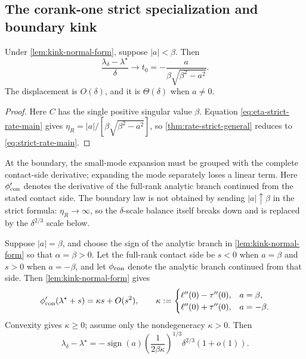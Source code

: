 \subsection{The corank-one strict specialization and boundary kink}

\begin{corollary}
\label{thm:rate-strict}
Under \cref{lem:kink-normal-form}, suppose \(|a|<\beta\).  Then
\begin{equation}
 \frac{\lambda_\delta-\lambda^\star}{\delta}
 \longrightarrow
 t_0=-\frac{a}{\beta\sqrt{\beta^2-a^2}}.
 \label{eq:strict-rate-main}
\end{equation}
The displacement is \(O(\delta)\), and it is \(\Theta(\delta)\) when
\(a\ne0\).
\end{corollary}

\begin{proof}
Here \(C\) has the single positive singular value \(\beta\).
Equation \eqref{eq:eta-strict-rate-main} gives
\(\eta_R=|a|/[\beta\sqrt{\beta^2-a^2}]\), so
\cref{thm:rate-strict-general} reduces to \eqref{eq:strict-rate-main}.
\end{proof}

At the boundary, the small-mode expansion must be grouped with the complete
contact-side derivative; expanding the mode separately loses a linear term.
Here \(\phi'_{\rm con}\) denotes the derivative of the full-rank analytic branch
continued from the stated contact side.
The boundary law is not obtained by sending \(|a|\uparrow\beta\) in the
strict formula: \(\eta_R\to\infty\), so the \(\delta\)-scale balance itself
breaks down and is replaced by the \(\delta^{2/3}\) scale below.

\begin{theorem}
\label{thm:rate-boundary}
Suppose \(|a|=\beta\), and choose the sign of the analytic branch in
\cref{lem:kink-normal-form} so that \(\alpha=\beta>0\).  Let the full-rank
contact side be \(s<0\) when \(a=\beta\) and \(s>0\) when \(a=-\beta\), and
let \(\phi_{\rm con}\) denote the analytic branch continued from that side.
Then \cref{lem:kink-normal-form} gives
\begin{equation}
 \phi'_{\rm con}(\lambda^\star+s)=\kappa s+O(s^2),
 \qquad
 \kappa:=
 \begin{cases}
  \ell''(0)-\tau''(0),&a=\beta,\\
  \ell''(0)+\tau''(0),&a=-\beta.
 \end{cases}
 \label{eq:contact-curvature-main}
\end{equation}
Convexity gives \(\kappa\ge0\); assume only the nondegeneracy
\(\kappa>0\).  Then
\begin{equation}
 \lambda_\delta-\lambda^\star
 =-\operatorname{sign}(a)
 \left(\frac{1}{2\beta\kappa}\right)^{1/3}
 \delta^{2/3}(1+o(1)).
 \label{eq:boundary-rate-main}
\end{equation}
\end{theorem}

